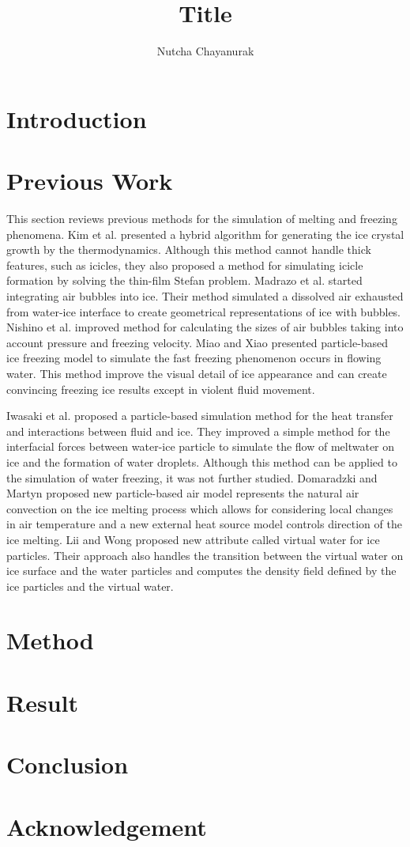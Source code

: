\documentclass[10pt, twocolumn] {IEEEtran}
\begin{document}
\title{Title}
\author{Nutcha Chayanurak}
\maketitle
\begin{abstract}  \end{abstract}
\section{Introduction}
\section{Previous Work}
 This section reviews previous methods for the simulation of melting and freezing phenomena. Kim et al.\cite{kim2004hybrid} presented a hybrid algorithm for generating the ice crystal growth by the thermodynamics. Although this method cannot handle thick features, such as icicles, they also proposed a method for simulating icicle formation by solving the thin-film Stefan problem\cite{kim2006modeling}. Madrazo et al. started integrating air bubbles into ice\cite{madrazo2009air}. Their method simulated a dissolved air exhausted from water-ice interface to create geometrical representations of ice with bubbles. Nishino et al.\cite{Nishino:2012:VSF:2407746.2407747} improved method for calculating the sizes of air bubbles taking into account pressure and freezing velocity. Miao and Xiao\cite{Miao:2015:PIF:2817675.2817676} presented particle-based ice freezing model to simulate the fast freezing phenomenon occurs in flowing water. This method improve the visual detail of ice appearance and can create convincing freezing ice results except in violent fluid movement. 
 
 Iwasaki et al.\cite{iwasaki2010fast} proposed a particle-based simulation method for the heat transfer and interactions between fluid and ice. They improved a simple method for the interfacial forces between water-ice particle to simulate the flow of meltwater on ice and the formation of water droplets. Although this method can be applied to the simulation of water freezing, it was not further studied.
 Domaradzki and Martyn\cite{domaradzki2014improved} proposed new particle-based air model represents the natural air convection on the ice melting process  which allows for considering  local changes in air temperature and a new external heat source model controls direction of the ice melting.
 Lii and Wong\cite{lii2014ice} proposed new attribute called virtual water for ice particles. Their approach also handles the transition between the virtual water on ice surface and the water particles and computes the density field defined by the ice particles and the virtual water.

\section{Method}
\section{Result}
\section{Conclusion}
\section{Acknowledgement}

\nocite{*}


\end{document}
